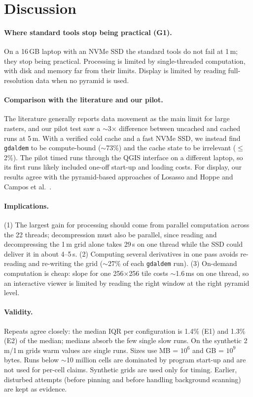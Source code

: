 ﻿\documentclass[11pt,a4paper]{article}
\begin{document}
\section{Discussion}
\paragraph{Where standard tools stop being practical (G1).} On a 16\,GB laptop with an NVMe SSD the standard tools
do not fail at 1\,m; they stop being practical. Processing is limited by single-threaded computation, with disk
and memory far from their limits. Display is limited by reading full-resolution data when no pyramid is used.

\paragraph{Comparison with the literature and our pilot.} The literature generally reports data movement as the main
limit for large rasters, and our pilot test saw a $\sim$3$\times$ difference between uncached and cached runs at
5\,m. With a verified cold cache and a fast NVMe SSD, we instead find \texttt{gdaldem} to be compute-bound
($\sim$73\%) and the cache state to be irrelevant ($\le$2\%). The pilot timed runs through the QGIS interface on a
different laptop, so its first runs likely included one-off start-up and loading costs. For display, our results
agree with the pyramid-based approaches of Losasso and Hoppe \cite{clipmaps} and Campos et al.\ \cite{campos}.

\paragraph{Implications.} (1) The largest gain for processing should come from parallel computation across the
22 threads; decompression must also be parallel, since reading and decompressing the 1\,m grid alone takes 29\,s on
one thread while the SSD could deliver it in about 4--5\,s. (2) Computing several derivatives in one pass avoids
re-reading and re-writing the grid ($\sim$27\% of each \texttt{gdaldem} run). (3) On-demand computation is cheap:
slope for one 256$\times$256 tile costs $\sim$1.6\,ms on one thread, so an interactive viewer is limited by reading
the right window at the right pyramid level.

\paragraph{Validity.} Repeats agree closely: the median IQR per configuration is 1.4\% (E1) and 1.3\% (E2) of the
median; medians absorb the few single slow runs. On the synthetic 2\,m/1\,m grids warm values are single runs.
Sizes use MB = $10^6$ and GB = $10^9$ bytes. Runs below $\sim$10 million cells are dominated by program start-up and are not used for per-cell claims.
Synthetic grids are used only for timing. Earlier, disturbed attempts (before pinning and before handling background
scanning) are kept as evidence.
\end{document}
